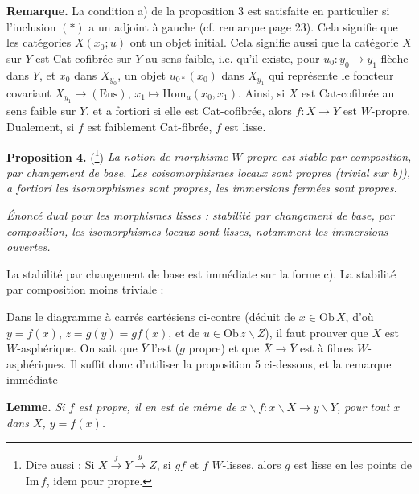 \documentclass[11pt,leqno]{article}
\newcommand{\msp}[1]{\marginpar{\footnotesize [#1]}}
\newcommand{\Ob}{\mathrm{Ob}\,}
\begin{document}
\textbf{Remarque.} La condition a) de la proposition 3 est satisfaite en particulier si l'inclusion $(*)$ a un adjoint à gauche (cf. remarque page 23). Cela signifie que les catégories $X(x_0;u)$ ont un objet initial. Cela signifie aussi que la catégorie $X$ sur $Y$ est Cat-cofibrée sur $Y$ au sens faible, i.e. qu'il existe, pour $u_0 : y_0 \longrightarrow y_1$ flèche dans $Y$, et $x_0$ dans $X_{y_0}$, un objet $u_{0*}(x_0)$ dans $X_{y_1}$ qui représente le foncteur covariant $X_{y_1} \longrightarrow (\mathrm{Ens})$, $x_1 \longmapsto \mathrm{Hom}_u(x_0, x_1)$. Ainsi, si $X$ est Cat-cofibrée au sens faible sur $Y$, et a fortiori si elle est Cat-cofibrée, alors $f : X \longrightarrow Y$ est $W$-propre. Dualement, si $f$ est faiblement Cat-fibrée, $f$ est lisse.

\textbf{Proposition 4.} (\footnote[43]{Dire aussi : Si $X \xrightarrow{f} Y \xrightarrow{g} Z$, si $gf$ et $f$ $W$-lisses, alors $g$ est lisse en les points de $\mathrm{Im}\, f$, idem pour propre.}) \textit{La notion de morphisme $W$-propre est stable par composition, par changement de base. Les coisomorphismes locaux sont propres (trivial sur b)), a fortiori les isomorphismes sont propres, les immersions fermées sont propres.}

\textit{Énoncé dual pour les morphismes lisses : stabilité par changement de base, par composition, les isomorphismes locaux sont lisses, notamment les immersions ouvertes.}

\msp{page 29}La stabilité par changement de base est immédiate sur la forme c). La stabilité par composition moins triviale :

\begin{center}
\end{center}

Dans le diagramme à carrés cartésiens ci-contre (déduit de $x \in \Ob X$, d'où $y = f(x)$, $z = g(y) = gf(x)$, et de $u \in \Ob z\backslash Z$), il faut prouver que $\bar{X}$ est $W$-asphérique. On sait que $\bar{Y}$ l'est ($g$ propre) et que $\bar{X} \longrightarrow \bar{Y}$ est à fibres $W$-asphériques. Il suffit donc d'utiliser la proposition 5 ci-dessous, et la remarque immédiate %

\textbf{Lemme.} \textit{Si $f$ est propre, il en est de même de $x\backslash f : x\backslash X \longrightarrow y\backslash Y$, pour tout $x$ dans $X$, $y = f(x)$.}
\end{document}
